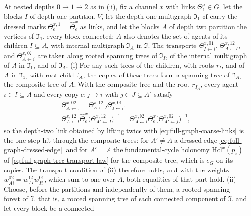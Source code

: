 At nested depths $0\to1\to2$ as in (ii), fix a channel $x$ with links
$\Theta^x_e\in G$, let the blocks $I$ of depth one partition $V$, let the depth-one multigraph $\mathfrak I_1$
of  carry the dressed marks $\Theta^{x,1}_e=\widehat\Theta^x_e$ as links,
and let the blocks $A$ of depth two partition the vertices of $\mathfrak I_1$, every block connected; $A$ also
denotes the set of agents of its children $I\subseteq A$, with internal multigraph $\mathfrak I_A$ in
$\mathfrak I$. The transports $\Theta^{x,01}_{I\leftarrow i}$, $\Theta^{x,12}_{A\leftarrow I}$, and
$\Theta^{x,02}_{A\leftarrow i}$ are taken along rooted spanning trees of $\mathfrak I_I$, of the internal
multigraph of $A$ in $\mathfrak I_1$, and of $\mathfrak I_A$. (i) For any such trees of the children, with
roots $r_I$, and of $A$ in $\mathfrak I_1$, with root child $I_A$, the copies of these trees form a spanning
tree of $\mathfrak I_A$, the composite tree of $A$. With the composite tree and the root $r_{I_A}$, every agent
$i\in I\subseteq A$ and every copy $e:j\to i$ with $j\in J\subseteq A'$ satisfy
\begin{equation}
\begin{gathered}
\Theta^{x,02}_{A\leftarrow i}=\Theta^{x,12}_{A\leftarrow I}\Theta^{x,01}_{I\leftarrow i},\\
\Theta^{x,12}_{A\leftarrow I}\widehat\Theta^x_e\bigl(\Theta^{x,12}_{A'\leftarrow J}\bigr)^{-1}
=\Theta^{x,02}_{A\leftarrow i}\Theta^x_e\bigl(\Theta^{x,02}_{A'\leftarrow j}\bigr)^{-1},
\end{gathered}
\label{eq:rg-forest-tree-composition}
\end{equation}
so the depth-two link obtained by lifting twice with \eqref{eq:full-graph-coarse-links} is the one-step lift
through the composite trees: for $A'\neq A$ a dressed edge \eqref{eq:full-graph-dressed-edge}, and for $A'=A$
the fundamental-cycle holonomy $\mathrm{Hol}^x(p_e)$ of \eqref{eq:full-graph-tree-transport-law} for the
composite tree, which is $e_G$ on its copies. The transport condition of
(ii) therefore holds, and with the weights
$w^{02}_{Ai}=w^{12}_{AI}w^{01}_{Ii}$, which sum to one over $A$, both equalities of that part hold. (ii)
Choose, before the partitions and independently of them, a rooted spanning forest of $\mathfrak I$, that is,
a rooted spanning tree of each connected component of $\mathfrak I$, and let every block be a connected
